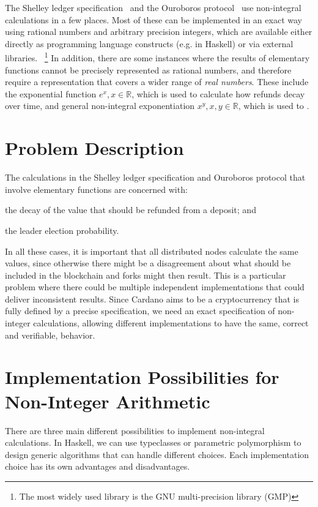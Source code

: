 \documentclass[11pt,a4paper,dvipsnames,twosided]{article}
\newcommand{\khcomment}[1]{\todo[color=blue!20]{KH: #1}}
\theoremstyle{definition}
\theoremstyle{definition}
\begin{document}
The Shelley ledger specification~\cite{shelley_spec} and the Ouroboros
protocol~\cite{ouroboros} use non-integral calculations in a few places. Most of
these can be implemented in an exact way using rational numbers and arbitrary
precision integers, which are available either directly as programming language
constructs (e.g. in Haskell) or via external libraries.~ \footnote{The most
  widely used library is the GNU multi-precision library (GMP)}
%
In addition, there are some instances where the results of elementary functions
cannot be precisely represented as rational numbers, and therefore require a
representation that covers a wider range of \emph{real numbers}.  These include
the exponential function $e^{x}, x \in \mathbb{R}$, which is used to calculate
how refunds decay over time, and general non-integral exponentiation
$x^{y}, x, y \in \mathbb{R}$, which is used to \khcomment{MG, please fix!}.

\section{Problem Description}
\label{sec:problem-description}

The calculations in the Shelley ledger specification and Ouroboros protocol that involve elementary functions are concerned with:
\begin{inparaenum}
\item
  the decay of the value that should be refunded from a deposit;
and
\item
  the leader election probability.
\end{inparaenum}
%
In all these cases, it is important that all distributed nodes calculate the
same values, since otherwise there might be a disagreement about what should be
included in the blockchain and forks might then result. This is a particular
problem where there could be multiple independent implementations that could
deliver inconsistent results.  Since Cardano aims to be a cryptocurrency that is
fully defined by a precise specification, we need an exact specification of
non-integer calculations, allowing different implementations to have the same,
correct and verifiable,
behavior.

\section{Implementation Possibilities for Non-Integer Arithmetic}
\label{sec:impl-poss}

There are three main different possibilities to implement non-integral
calculations. In Haskell, we can use typeclasses or parametric polymorphism
to design generic algorithms that can handle different choices. Each implementation choice has its
own advantages and disadvantages.
\end{document}
